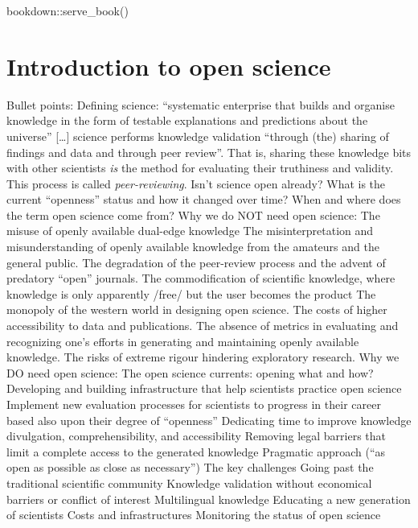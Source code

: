\documentclass[
]{book}
\newenvironment{Shaded}{\begin{snugshade}}{\end{snugshade}}
\newcommand{\FunctionTok}[1]{\textcolor[rgb]{0.00,0.00,0.00}{#1}}
\newcommand{\NormalTok}[1]{#1}
\newcommand{\SpecialCharTok}[1]{\textcolor[rgb]{0.00,0.00,0.00}{#1}}
\begin{document}
\begin{Shaded}
\begin{Highlighting}[]
\NormalTok{bookdown}\SpecialCharTok{::}\FunctionTok{serve\_book}\NormalTok{()}
\end{Highlighting}
\end{Shaded}

\hypertarget{introduction-to-open-science}{%
\chapter{Introduction to open science}\label{introduction-to-open-science}}

Bullet points:
Defining science: ``systematic enterprise that builds and organise knowledge in the form of testable explanations and predictions about the universe'' {[}\ldots{]} science performs knowledge validation ``through (the) sharing of findings and data and through peer review''. That is, sharing these knowledge bits with other scientists \emph{is} the method for evaluating their truthiness and validity. This process is called \emph{peer-reviewing}.
Isn't science open already? What is the current ``openness'' status and how it changed over time? When and where does the term open science come from?
Why we do NOT need open science:
The misuse of openly available dual-edge knowledge
The misinterpretation and misunderstanding of openly available knowledge from the amateurs and the general public.
The degradation of the peer-review process and the advent of predatory ``open'' journals.
The commodification of scientific knowledge, where knowledge is only apparently /free/ but the user becomes the product
The monopoly of the western world in designing open science.
The costs of higher accessibility to data and publications.
The absence of metrics in evaluating and recognizing one's efforts in generating and maintaining openly available knowledge.
The risks of extreme rigour hindering exploratory research.
Why we DO need open science:
The open science currents: opening what and how?
Developing and building infrastructure that help scientists practice open science
Implement new evaluation processes for scientists to progress in their career based also upon their degree of ``openness''
Dedicating time to improve knowledge divulgation, comprehensibility, and accessibility
Removing legal barriers that limit a complete access to the generated knowledge
Pragmatic approach (``as open as possible as close as necessary'')
The key challenges
Going past the traditional scientific community
Knowledge validation without economical barriers or conflict of interest
Multilingual knowledge
Educating a new generation of scientists
Costs and infrastructures
Monitoring the status of open science
\end{document}
